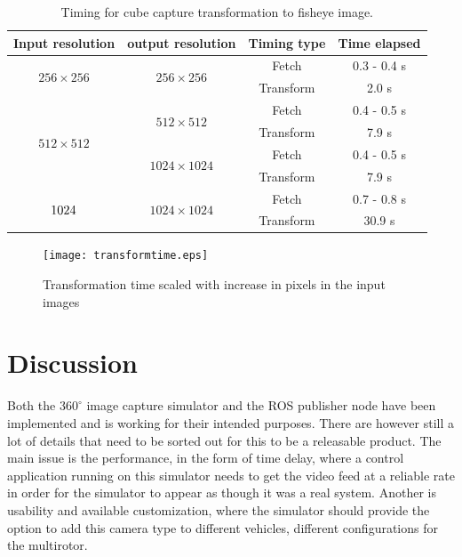 \begin{table}[!htb]
    \centering
    \caption{Timing for cube capture transformation to fisheye image.}
    \label{tab:res_timing_cube_capture}
    \begin{tabular}{|c|c|c|c|} \hline
        \textbf{Input resolution} & \textbf{output resolution} & \textbf{Timing type} & \textbf{Time elapsed} \\ \hline \hline
        \multirow{2}{*}{$256 \times 256$} & \multirow{2}{*}{$256 \times 256$} & Fetch & 0.3 - 0.4 s\\ \cline{3-4}
         & & Transform & 2.0 s\\ \hline
        \multirow{4}{*}{$512 \times 512$} & \multirow{2}{*}{$512 \times 512$} & Fetch & 0.4 - 0.5 s \\ \cline{3-4}
         & & Transform & 7.9 s\\ \cline{2-4}
         & \multirow{2}{*}{$1024 \times 1024$} & Fetch & 0.4 - 0.5 s\\ \cline{3-4}
         & & Transform & 7.9 s\\ \hline
        \multirow{2}{*}{$1024 \time 1024$} & \multirow{2}{*}{$1024 \times 1024$} & Fetch & 0.7 - 0.8 s\\ \cline{3-4}
         & & Transform & 30.9 s\\ \hline
    \end{tabular}
\end{table}

\begin{figure}[!htb]
    \centering
    \texttt{[image: transformtime.eps]}
    \caption{Transformation time scaled with increase in pixels in the input images}
    \label{fig:res_time_scale_plot}
\end{figure}

\newpage\section{Discussion}

Both the $360^\circ$ image capture simulator and the ROS publisher node have been implemented and is working for their intended purposes. There are however still a lot of details that need to be sorted out for this to be a releasable product. The main issue is the performance, in the form of time delay, where a control application running on this simulator needs to get the video feed at a reliable rate in order for the simulator to appear as though it was a real system. Another is usability and available customization, where the simulator should provide the option to add this camera type to different vehicles, different configurations for the multirotor.

